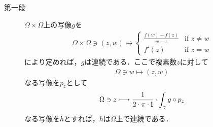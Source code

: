 	\begin{sketch}[大雑把]\mbox{}
		\begin{description}
			\item[第一段]
				$\Omega \times \Omega$上の写像$g$を
				\begin{align}
					\Omega \times \Omega \ni (z,w) \longmapsto
					\begin{cases}
						{\displaystyle \frac{f(w) - f(z)}{w-z}} & \mbox{if } z \neq w \\
						f'(z) & \mbox{if } z = w
					\end{cases}
				\end{align}
				により定めれば，$g$は連続である．ここで複素数$z$に対して
				\begin{align}
					\Omega \ni w \longmapsto (z,w)
				\end{align}
				なる写像を$p_{z}$として
				\begin{align}
					\Omega \ni z \longmapsto \frac{1}{2\cdot\pi\cdot\mathbf{i}} \cdot \int_{\gamma} g \circ p_{z}
				\end{align}
				なる写像を$h$とすれば，$h$は$\Omega$上で連続である．
				

\end{description}
\end{sketch}

